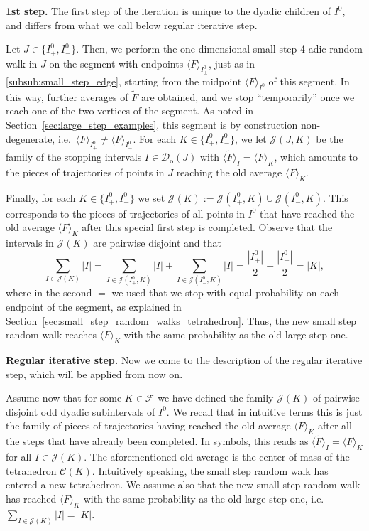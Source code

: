 \documentclass{amsart}
\newcommand{\cD}{\mathcal{D}}
\newcommand{\wt}{\widetilde}
\theoremstyle{definition}
\theoremstyle{remark}
\begin{document}
\textbf{1st step.} The first step of the iteration is unique to the dyadic children of $I^{0}$, and differs from what we call below regular iterative step.

Let $J\in\{I^{0}_{+},I^{0}_{-}\}$. Then, we perform the one dimensional small step 4-adic random walk in $J$ on the segment with endpoints $\langle F\rangle_{I^{0}_{\pm}}$, just as in \ref{subsub:small_step_edge}, starting from the midpoint $\langle F\rangle_{I^{0}}$ of this segment. In this way, further averages of $\wt{F}$ are obtained, and we stop ``temporarily'' once we reach one of the two vertices of the segment. As noted in Section~\ref{sec:large_step_examples}, this segment is by construction non-degenerate, i.e.~$\langle F\rangle_{I^{0}_{+}}\neq\langle F\rangle_{I^{0}_{-}}$. For each $K\in\{I^{0}_{+},I^{0}_{-}\}$, we let $\mathscr{J}(J,K)$ be the family of the stopping intervals $I\in\cD_{\mathrm{o}}(J)$ with $\langle\wt{F}\rangle_{I}=\langle F\rangle_{K}$, which amounts to the pieces of trajectories of points in $J$ reaching the old average $\langle F\rangle_{K}$.

Finally, for each $K\in\{I^{0}_{+},I^{0}_{-}\}$ we set $\mathscr{J}(K):=\mathscr{J}(I^{0}_{+},K)\cup\mathscr{J}(I^{0}_{-},K)$. This corresponds to the pieces of trajectories of all points in $I^{0}$ that have reached the old average $\langle F\rangle_{K}$ after this special first step is completed. Observe that the intervals in $\mathscr{J}(K)$ are pairwise disjoint and that
\begin{equation*}
    \sum_{I\in\mathscr{J}(K)}|I|=\sum_{I\in\mathscr{J}(I^{0}_{+},K)}|I|+\sum_{I\in\mathscr{J}(I^{0}_{-},K)}|I|=\frac{|I^0_{+}|}{2}+\frac{|I^0_{-}|}{2}=|K|,
\end{equation*}
where in the second $=$ we used that we stop with equal probability on each endpoint of the segment, as explained in Section~\ref{sec:small_step_random_walks_tetrahedron}. Thus, the new small step random walk reaches $\langle F\rangle_{K}$ with the same probability as the old large step one.

\medskip

\textbf{Regular iterative step.} Now we come to the description of the regular iterative step, which will be applied from now on.

Assume now that for some $K\in\mathscr{F}$ we have defined the family $\mathscr{J}(K)$ of pairwise disjoint odd dyadic subintervals of $I^0$. We recall that in intuitive terms this is just the family of pieces of trajectories having reached the old average $\langle F\rangle_{K}$ after all the steps that have already been completed. In symbols, this reads as $\langle\wt{F}\rangle_{I}=\langle F\rangle_{K}$ for all $I\in\mathscr{J}(K)$. The aforementioned old average is the center of mass of the tetrahedron $\mathscr{C}(K)$. Intuitively speaking, the small step random walk has entered a new tetrahedron. We assume also that the new small step random walk has reached $\langle F\rangle_{K}$ with the same probability as the old large step one, i.e.~$\sum_{I\in\mathscr{J}(K)}|I|=|K|$.
\end{document}
